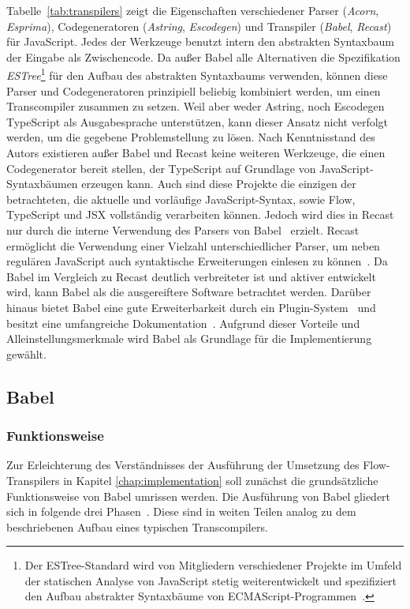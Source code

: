 Tabelle~\ref{tab:transpilers} zeigt die Eigenschaften verschiedener Parser (\textit{Acorn}, \textit{Esprima}), Codegeneratoren (\textit{Astring}, \textit{Escodegen}) und Transpiler (\textit{Babel}, \textit{Recast}) für JavaScript. Jedes der Werkzeuge benutzt intern den abstrakten Syntaxbaum der Eingabe als Zwischencode. Da außer Babel alle Alternativen die Spezifikation \textit{ESTree}\footnote{Der ESTree-Standard wird von Mitgliedern verschiedener Projekte im Umfeld der statischen Analyse von JavaScript stetig weiterentwickelt und spezifiziert den Aufbau abstrakter Syntaxbäume von ECMAScript-Programmen~\autocite{ESTREE_SPEC}.} für den Aufbau des abstrakten Syntaxbaums verwenden, können diese Parser und Codegeneratoren prinzipiell beliebig kombiniert werden, um einen Transcompiler zusammen zu setzen. Weil aber weder Astring, noch Escodegen TypeScript als Ausgabesprache unterstützen, kann dieser Ansatz nicht verfolgt werden, um die gegebene Problemstellung zu lösen. Nach Kenntnisstand des Autors existieren außer Babel und Recast keine weiteren Werkzeuge, die einen Codegenerator bereit stellen, der TypeScript auf Grundlage von JavaScript-Syntaxbäumen erzeugen kann. Auch sind diese Projekte die einzigen der betrachteten, die aktuelle und vorläufige JavaScript-Syntax, sowie Flow, TypeScript und JSX vollständig verarbeiten können. Jedoch wird dies in Recast nur durch die interne Verwendung des Parsers von Babel~\autocite{BABEL:PARSER} erzielt. Recast ermöglicht die Verwendung einer Vielzahl unterschiedlicher Parser, um neben regulären JavaScript auch syntaktische Erweiterungen einlesen zu können~\autocite{RECAST}. Da Babel im Vergleich zu Recast deutlich verbreiteter ist und aktiver entwickelt wird, kann Babel als die ausgereiftere Software betrachtet werden. Darüber hinaus bietet Babel eine gute Erweiterbarkeit durch ein Plugin-System~\autocite{BABEL:HANDBOOK} und besitzt eine umfangreiche Dokumentation~\autocite{BABEL:DOCS}. Aufgrund dieser Vorteile und Alleinstellungsmerkmale wird Babel als Grundlage für die Implementierung gewählt.

\subsection{Babel}
\label{sec:babel}

\subsubsection{Funktionsweise}

Zur Erleichterung des Verständnisses der Ausführung der Umsetzung des Flow-Transpilers in Kapitel \ref{chap:implementation} soll zunächst die grundsätzliche Funktionsweise von Babel umrissen werden. Die Ausführung von Babel gliedert sich in folgende drei Phasen~\autocite{BABEL:HANDBOOK}. Diese sind in weiten Teilen analog zu dem beschriebenen Aufbau eines typischen Transcompilers.

